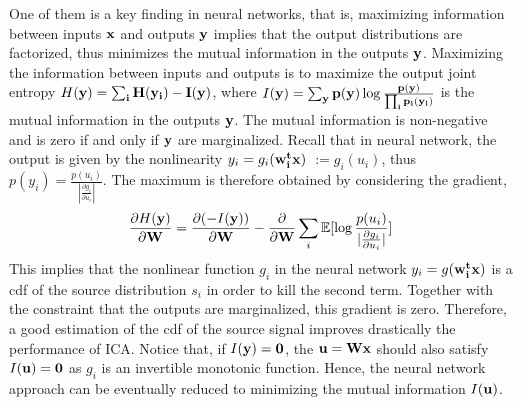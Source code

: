 \documentclass[aps,prl,preprint,superscriptaddress]{revtex4-2}
\begin{document}
One of them is a key finding in neural networks, that is, maximizing information between inputs $\bf{x}$ and outputs $\bf{y}$ implies that the output distributions are factorized, thus minimizes the mutual information in the outputs $\bf{y}$. Maximizing the information between inputs and outputs is to maximize the output joint entropy $H(\bf{y}) = \sum_{i}H(y_{i}) - I(\bf{y})$, where $I(\bf{y}) = \sum_{\bf{y}}p(\bf{y})\log\frac{p(\bf{y})}{\prod_{i}p_{i}(y_{i})}$ is the mutual information in the outputs $\bf{y}$. The mutual information is non-negative and is zero if and only if $\bf{y}$ are marginalized. Recall that in neural network, the output is given by the nonlinearity $y_{i} = g_{i}(\bf{w}_{i}^{t}\bf{x})$ $:= g_{i}(u_{i})$, thus $p(y_{i}) = \frac{p(u_{i})}{|\frac{\partial g_{i}}{\partial u_{i}}|}$. The maximum is therefore obtained by considering the gradient,
\begin{equation}
\frac{\partial H(\bf{y})}{\partial \bf{W}} = \frac{\partial (-I(\bf{y}))}{\partial \bf{W}} - \frac{\partial}{\partial \bf{W}}\sum_{i} \mathbb{E}[\log \frac{p(u_{i})}{|\frac{\partial g_{i}}{\partial u_{i}}|} ] 
\end{equation}
 This implies that the nonlinear function $g_{i}$ in the neural network $y_{i} = g(\bf{w}_{i}^{t}\bf{x})$ is a cdf of the source distribution $s_{i}$ in order to kill the second term. Together with the constraint that the outputs are marginalized, this gradient is zero. Therefore, a good estimation of the cdf of the source signal improves drastically the performance of ICA. Notice that, if $I(\bf{y}) = 0$, the $\bf{u} = \bf{W}\bf{x}$ should also satisfy $I(\bf{u}) = 0$ as $g_{i}$ is an invertible monotonic function. Hence, the neural network approach can be eventually reduced to minimizing the mutual information $I(\bf{u})$.

\end{document}
